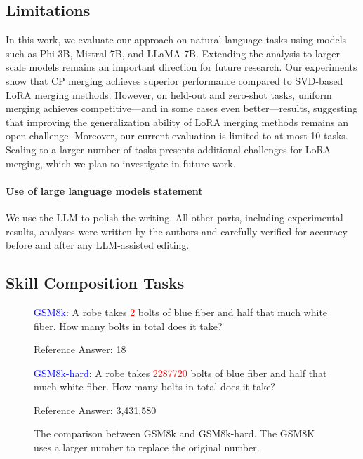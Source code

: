 \documentclass[10pt]{article} %
\begin{document}
\subsection{Limitations}

In this work, we evaluate our approach on natural language tasks using models such as Phi-3B, Mistral-7B, and LLaMA-7B. Extending the analysis to larger-scale models remains an important direction for future research. Our experiments show that CP merging achieves superior performance compared to SVD-based LoRA merging methods. However, on held-out and zero-shot tasks, uniform merging achieves competitive—and in some cases even better—results, suggesting that improving the generalization ability of LoRA merging methods remains an open challenge. Moreover, our current evaluation is limited to at most 10 tasks. Scaling to a larger number of tasks presents additional challenges for LoRA merging, which we plan to investigate in future work.

\paragraph{Use of large language models statement}

We use the LLM to polish the writing. All other parts, including experimental results, analyses 
were written by the authors and carefully verified for accuracy before and after any LLM-assisted
editing.




\subsection{Skill Composition Tasks}
\label{sec:skill_composition}

\begin{figure}[h]
        \centering
        \begin{prompt}
            [title={GSM8k vs GSM8k-hard}] { \textcolor{blue}{GSM8k}: A robe takes \textcolor{red}{2} bolts of blue fiber and half that much white fiber. How many bolts in total does it take?

            Reference Answer: 18

            \textcolor{blue}{GSM8k-hard}: A robe takes \textcolor{red}{2287720} bolts of blue fiber and half that much white fiber. How many bolts in total does it take?

            Reference Answer: 3,431,580 }
        \end{prompt}
        \caption{The comparison between GSM8k and GSM8k-hard. The GSM8K uses a larger
        number to replace the original number.}
        \label{prompt-verifier}
\end{figure}
\end{document}
